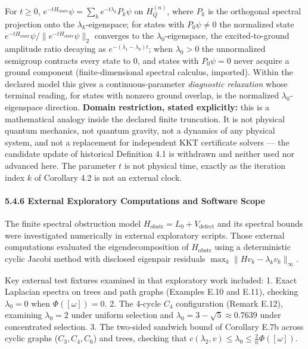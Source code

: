 \documentclass[
]{article}
\begin{document}
For \(t \ge 0\), \(e^{-tH_{\mathrm{obstr}}}\psi = \sum_k e^{-t\lambda_k} P_k \psi\) on \(H_Q^{(n)}\), where \(P_k\) is the orthogonal spectral projection onto the \(\lambda_k\)-eigenspace; for states with \(P_0\psi \neq 0\) the normalized state \(e^{-tH_{\mathrm{obstr}}}\psi / \|e^{-tH_{\mathrm{obstr}}}\psi\|_2\) converges to the \(\lambda_0\)-eigenspace, the excited-to-ground amplitude ratio decaying as \(e^{-(\lambda_1 - \lambda_0)t}\); when \(\lambda_0 > 0\) the unnormalized semigroup contracts every state to \(0\), and states with \(P_0\psi = 0\) never acquire a ground component (finite-dimensional spectral calculus, imported). Within the declared model this gives a continuous-parameter \emph{diagnostic relaxation} whose terminal reading, for states with nonzero ground overlap, is the normalized \(\lambda_0\)-eigenspace direction. \textbf{Domain restriction, stated explicitly:} this is a mathematical analogy inside the declared finite truncation. It is not physical quantum mechanics, not quantum gravity, not a dynamics of any physical system, and not a replacement for independent KKT certificate solvers --- the candidate update of historical Definition 4.1 is withdrawn and neither used nor advanced here. The parameter \(t\) is not physical time, exactly as the iteration index \(k\) of Corollary 4.2 is not an external clock.

\paragraph{5.4.6 External Exploratory Computations and Software Scope}\label{external-exploratory-computations-and-software-scope}

The finite spectral obstruction model \(H_{\mathrm{obstr}} = L_0 + V_{\mathrm{defect}}\) and its spectral bounds were investigated numerically in external exploratory scripts. Those external computations evaluated the eigendecomposition of \(H_{\mathrm{obstr}}\) using a deterministic cyclic Jacobi method with disclosed eigenpair residuals \(\max_k \|H v_k - \lambda_k v_k\|_\infty\).

Key external test fixtures examined in that exploratory work included:
1. Exact Laplacian spectra on trees and path graphs (Examples E.10 and E.11), checking \(\lambda_0 = 0\) when \(\Phi([\omega]) = 0\).
2. The 4-cycle \(C_4\) configuration (Remark E.12), examining \(\lambda_0 = 2\) under uniform selection and \(\lambda_0 = 3 - \sqrt{5} \approx 0.7639\) under concentrated selection.
3. The two-sided sandwich bound of Corollary E.7b across cyclic graphs (\(C_3, C_4, C_6\)) and trees, checking that \(c(\lambda_2, v) \le \lambda_0 \le \frac{2}{n}\Phi([\omega])\).
\end{document}
